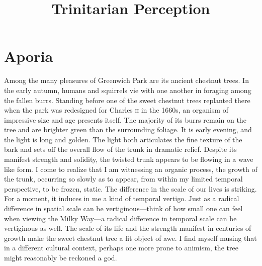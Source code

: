 \documentclass[12pt]{article}
\title{Trinitarian Perception}
\author{\myauthor}
\date{} %
\begin{document}
\maketitle

\setlength{\parindent}{1em}


\section{Aporia} %
\label{sec:aporia}

Among the many pleasures of Greenwich Park are its ancient chestnut trees. In the early autumn, humans and squirrels vie with one another in foraging among the fallen burrs. Standing before one of the sweet chestnut trees replanted there when the park was redesigned for Charles \textsc{ii} in the 1660s, an organism of impressive size and age presents itself. The majority of its burrs remain on the tree and are brighter green than the surrounding foliage. It is early evening, and the light is long and golden. The light both articulates the fine texture of the bark and sets off the overall flow of the trunk in dramatic relief. Despite its manifest strength and solidity, the twisted trunk appears to be flowing in a wave like form. I come to realize that I am witnessing an organic process, the growth of the trunk, occurring so slowly as to appear, from within my limited temporal perspective, to be frozen, static. The difference in the scale of our lives is striking. For a moment, it induces in me a kind of temporal vertigo.  Just as a radical difference in spatial scale can be vertiginous---think of how small one can feel when viewing the Milky Way---a radical difference in temporal scale can be vertiginous as well. The scale of its life and the strength manifest in centuries of growth make the sweet chestnut tree a fit object of awe. I find myself musing that in a different cultural context, perhaps one more prone to animism, the tree might reasonably be reckoned a god. 
\end{document}
